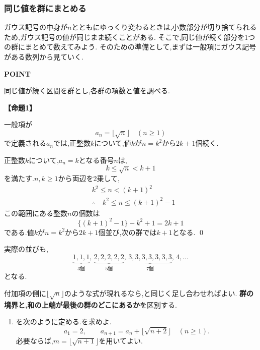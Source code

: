 \subsubsection{同じ値を群にまとめる}\label{節：同じ値を群にまとめる}
ガウス記号の中身が$n$とともにゆっくり変わるときは,小数部分が切り捨てられるため,ガウス記号の値が同じまま続くことがある.
そこで,同じ値が続く部分を1つの群にまとめて数えてみよう.
そのための準備として,まずは一般項にガウス記号がある数列から見ていく.

\begin{bookpoint}
  \textbf{POINT}\par
  同じ値が続く区間を群とし,各群の項数と値を調べる.
\end{bookpoint}

\noindent{}\label{証明：ガウス型の群数列}\textbf{【命題1】}\par\nobreak
\begin{smallquote}
  一般項が
  \[
    a_n=\lfloor \sqrt{n} \rfloor\quad(n\ge1)
  \]
  で定義される$a_n$では,正整数$k$について,値$k$が$n=k^2$から$2k+1$個続く.
\end{smallquote}
\begin{smallquote}
  正整数$k$について,$a_n=k$となる番号$n$は,
  \[
    k\le\sqrt{n}<k+1
  \]
  を満たす.$n,k\ge1$から両辺を2乗して,
  \begin{align*}
    & k^2\le n <(k+1)^2                      \\
    & \therefore\quad k^2\le n \le (k+1)^2-1
  \end{align*}
  この範囲にある整数$n$の個数は
  \[
    \{(k+1)^2-1\}-k^2+1=2k+1
  \]
  である.値$k$が$n=k^2$から$2k+1$個並び,次の群では$k+1$となる. \qed
\end{smallquote}

実際の並びも,
\[
  \underbrace{1,1,1}_{3\text{個}},\,
  \underbrace{2,2,2,2,2}_{5\text{個}},\,
  \underbrace{3,3,3,3,3,3,3}_{7\text{個}},\,4,\ldots
\]
となる.

付加項の側に$\lfloor\sqrt n\rfloor$のような式が現れるなら,と同じく足し合わせればよい.
\textbf{群の境界と,和の上端が最後の群のどこにあるか}を区別する.

\noindent {}\par\nobreak
\begin{enumerate}[label=(\arabic*),parsep=3pt,beginpenalty=10000,format=\bookitemlink{example-gauss-role-2}{problem}{hint}]
  \item {}を次のように定める.を求めよ.
    \[
      a_1=2,\qquad
      a_{n+1}=a_n+\lfloor\sqrt{n+2}\rfloor
      \quad(n\ge1).
    \]
    必要ならば,$m=\lfloor\sqrt{n+1}\rfloor$を用いてよい.
\end{enumerate}

